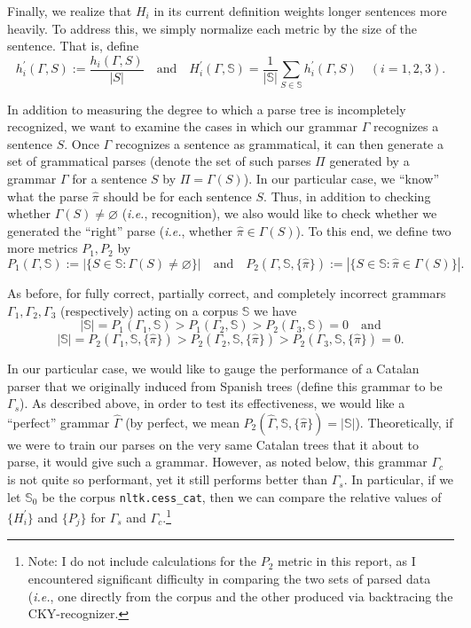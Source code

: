 \documentclass[paper=a4, fontsize=11pt]{scrartcl} %
\newcommand{\gcat}{\Gamma_{c}}
\newcommand{\gesp}{\Gamma_{s}}
\begin{document}
Finally, we realize that $H_i$ in its current definition weights longer sentences more heavily.  To address this, we simply normalize each metric by the size of the sentence.  That is, define $$ h_i^\prime(\Gamma,S) := \frac{h_i(\Gamma,S)}{|S|} \quad\mbox{and}\quad H_i^\prime(\Gamma,\mathbb{S}) = \frac{1}{|\mathbb{S}|}\sum_{S \in \mathbb{S}} h_i^\prime(\Gamma,S) \quad (i = 1,2,3). $$

In addition to measuring the degree to which a parse tree is incompletely recognized, we want to examine the cases in which our grammar $\Gamma$ recognizes a sentence $S$.  Once $\Gamma$ recognizes a sentence as grammatical, it can then generate a set of grammatical parses (denote the set of such parses $\Pi$ generated by a grammar $\Gamma$ for a sentence $S$ by $\Pi = \Gamma(S)$).  In our particular case, we ``know'' what the parse $\hat{\pi}$ should be for each sentence $S$.  Thus, in addition to checking whether $\Gamma(S) \neq \varnothing$ (\textit{i.e.}, recognition), we also would like to check whether we generated the ``right'' parse (\textit{i.e.}, whether $\hat{\pi} \in \Gamma(S)$).  To this end, we define two more metrics $P_1, P_2$ by $$ P_1(\Gamma, \mathbb{S}) := \left| \{ S \in \mathbb{S} : \Gamma(S) \neq \varnothing \} \right| \quad\mbox{and}\quad P_2(\Gamma, \mathbb{S}, \{ \hat{\pi} \}) := \left| \{ S \in \mathbb{S} : \hat{\pi} \in \Gamma(S) \} \right|. $$

As before, for fully correct, partially correct, and completely incorrect grammars $\Gamma_1, \Gamma_2, \Gamma_3$ (respectively) acting on a corpus $\mathbb{S}$ we have $$ |\mathbb{S}| = P_1(\Gamma_1,\mathbb{S}) > P_1(\Gamma_2,\mathbb{S}) > P_2(\Gamma_3,\mathbb{S}) = 0 \quad\mbox{and}$$ $$ |\mathbb{S}| = P_2(\Gamma_1,\mathbb{S},\{ \hat{\pi} \}) > P_2(\Gamma_2,\mathbb{S},\{ \hat{\pi} \}) > P_2(\Gamma_3,\mathbb{S},\{ \hat{\pi} \}) = 0. $$

In our particular case, we would like to gauge the performance of a Catalan parser that we originally induced from Spanish trees (define this grammar to be $\gesp$).  As described above, in order to test its effectiveness, we would like a ``perfect'' grammar $\hat{\Gamma}$ (by perfect, we mean $P_2(\hat{\Gamma},\mathbb{S},\{ \hat{\pi} \}) = | \mathbb{S} |$).  Theoretically, if we were to train our parses on the very same Catalan trees that it about to parse, it would give such a grammar.  However, as noted below, this grammar $\gcat$ is not quite so performant, yet it still performs better than $\gesp$.  In particular, if we let $\mathbb{S}_0$ be the corpus \texttt{nltk.cess\_cat}, then we can compare the relative values of $\{ H_i^\prime \}$ and $\{ P_j \}$ for $\gesp$ and $\gcat$.\footnote{Note: I do not include calculations for the $P_2$ metric in this report, as I encountered significant difficulty in comparing the two sets of parsed data (\textit{i.e.}, one directly from the corpus and the other produced via backtracing the CKY-recognizer.}
\end{document}
